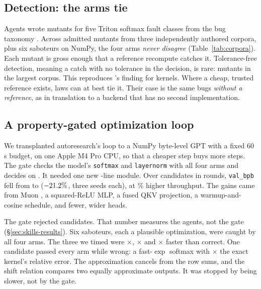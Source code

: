 \subsection{Detection: the arms tie}
\label{sec:detection}

Agents wrote mutants for five Triton softmax fault classes from the bug taxonomy
\citep{rathnasuriya2026tile}. Across \mutantsAdmitted{} admitted mutants from three
independently authored corpora, plus six saboteurs on NumPy, the four arms \emph{never
disagree} (Table~\ref{tab:corpora}). Each mutant is gross enough that a reference
recompute catches it. Tolerance-free detection, meaning a catch with no tolerance in the
decision, is rare: \grownTolFree{} mutants in the largest corpus. This reproduces
\citeauthor{hughes2020specify}'s finding for kernels. Where a cheap, trusted reference
exists, laws can at best tie it. Their case is the same bugs \emph{without a reference},
as in translation to a backend that has no second implementation.

\subsection{A property-gated optimization loop}
\label{sec:loop}

We transplanted autoresearch's loop \citep{karpathy2026autoresearch} to a NumPy
byte-level GPT with a fixed 60\,s budget, on one Apple M4 Pro CPU, so that a cheaper step
buys more steps. The gate checks the model's \texttt{softmax} and \texttt{layernorm} with
all four arms and decides on \DeclArm. It needed one new \loopGateLines-line module.
Over \loopCandidates{} candidates in \loopRounds{} rounds, \texttt{val\_bpb} fell from
\loopBpbBase{} to \loopBpbBest{} ($-21.2\%$, three seeds each), at
\loopTputGain\% higher throughput. The gains came from Muon \citep{jordan2024muon}, a
squared-ReLU MLP, a fused QKV projection, a warmup-and-cosine schedule, and fewer, wider
heads.

The gate rejected \loopRejections{} candidates. That number measures the agents, not
the gate (\S\ref{sec:skills-results}). Six saboteurs, each a plausible optimization, were
caught by all four arms. The three we timed were \sabSpeedNoMax$\times$,
\sabSpeedNoCenter$\times$ and \sabSpeedNoDivide$\times$ faster than correct. One
candidate passed every arm while wrong: a fast-$\exp$ softmax with
\fastExpWorse$\times$ the exact kernel's relative error. The approximation cancels from
the row sums, and the shift relation compares two equally approximate outputs. It was
stopped by being slower, not by the gate.


